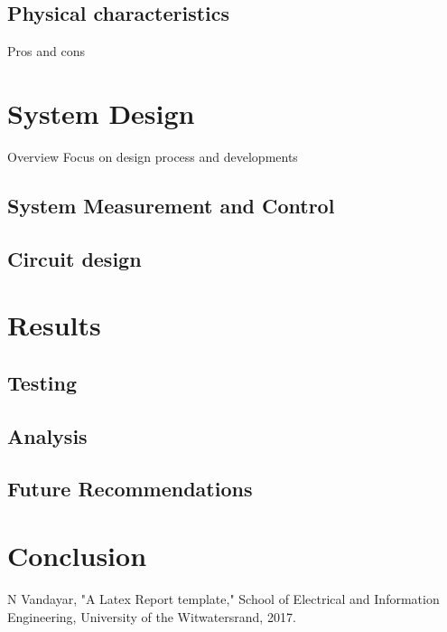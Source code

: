 \documentclass{TechReport}
\begin{document}
\subsection{Physical characteristics}
\label{sec:Physics}
Pros and cons

\section{System Design}
\label{sec:Design}

Overview
Focus on design process and developments

\subsection{System Measurement and Control}
\label{sec:Control}


\subsection{Circuit design}
\label{sec:Circuit}


\section{Results}

\subsection{Testing}
\label{sec:Testing}


\subsection{Analysis}
\label{sec:Analysis}

\subsection{Future Recommendations}
\label{sec:Future}


\section{Conclusion}
\label{sec:Conclusion}


\begin{thebibliography}{99}	
 N Vandayar, "A Latex Report template," School of Electrical and Information Engineering, University of the Witwatersrand, 2017.


	 
\end{thebibliography}
\end{document}
